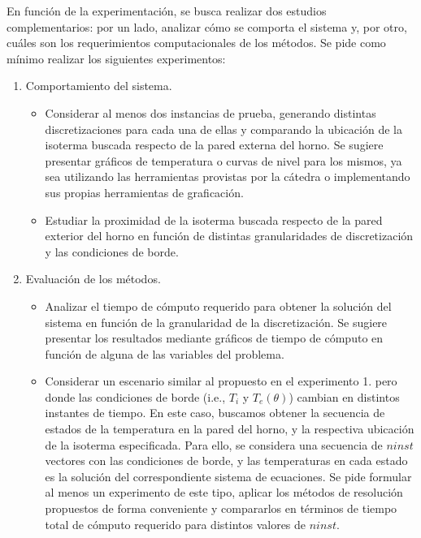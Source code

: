 En funci\'on de la experimentaci\'on, se busca realizar dos estudios complementarios: por un lado, analizar c\'omo se comporta el sistema y, por otro, 
cu\'ales son los requerimientos computacionales de los m\'etodos. Se pide como m\'inimo realizar los siguientes experimentos:
\begin{enumerate}
\item Comportamiento del sistema.
\begin{itemize}
\item Considerar al menos dos instancias de prueba, generando distintas discretizaciones para cada una de ellas y
comparando la ubicaci\'on de la isoterma buscada respecto de la pared externa del horno. Se sugiere presentar gr\'aficos
de temperatura o curvas de nivel para los mismos, ya sea utilizando las herramientas provistas por la c\'atedra o
implementando sus propias herramientas de graficaci\'on. 
\item Estudiar la proximidad de la isoterma buscada respecto de la pared exterior del horno en funci\'on de distintas 
granularidades de discretizaci\'on y las condiciones de borde. 
\end{itemize}
\item Evaluaci\'on de los m\'etodos.
\begin{itemize}
\item Analizar el tiempo de c\'omputo requerido para obtener la soluci\'on del sistema en funci\'on de la granularidad de 
la discretizaci\'on. Se sugiere presentar los resultados mediante gr\'aficos de tiempo de c\'omputo en funci\'on de alguna 
de las variables del problema.
\item Considerar un escenario similar al propuesto en el experimento 1. pero donde las condiciones de borde (i.e., $T_i$ y $T_e(\theta)$)
cambian en distintos instantes de tiempo. En este caso, buscamos obtener la secuencia de estados de la temperatura en
la pared del horno, y la respectiva ubicaci\'on de la isoterma especificada. Para ello, se considera una secuencia de $ninst$
vectores con las condiciones de borde, y las temperaturas en cada estado es la soluci\'on del correspondiente sistema de
ecuaciones. Se pide formular al menos un experimento de este tipo, aplicar los m\'etodos de resoluci\'on propuestos de
forma conveniente y compararlos en t\'erminos de tiempo total de c\'omputo requerido para distintos valores de $ninst$.
\end{itemize}
\end{enumerate}

